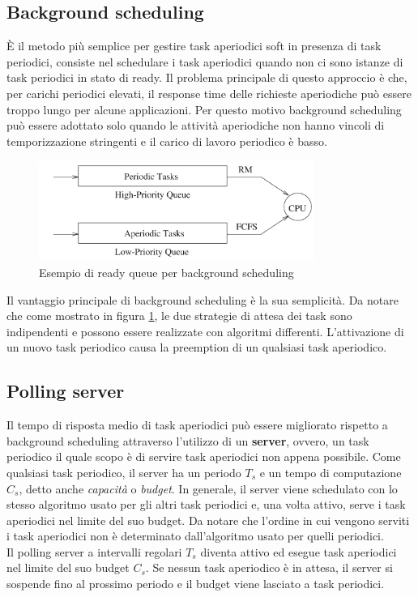 \documentclass[12pt]{article}
\begin{document}
\subsection{Background scheduling}
\label{sec:backgroundScheduling}
È il metodo più semplice per gestire task aperiodici soft in presenza di task periodici, consiste nel schedulare i task aperiodici quando non ci sono istanze di task periodici in stato di ready.
Il problema principale di questo approccio è che, per carichi periodici elevati, il response time delle richieste aperiodiche può essere troppo lungo per alcune applicazioni.
Per questo motivo background scheduling può essere adottato solo quando le attività aperiodiche non hanno vincoli di temporizzazione stringenti e il carico di lavoro periodico è basso.
\begin{figure}[H]
    \centering
    \includegraphics[width=0.8\textwidth]{pictures/backgroundScheduling.png}
    \caption{Esempio di ready queue per background scheduling}  
    \label{fig:backgroundScheduling}
\end{figure}
\noindent
Il vantaggio principale di background scheduling è la sua semplicità.
Da notare che come mostrato in figura \ref{fig:backgroundScheduling}, le due strategie di attesa dei task sono indipendenti e possono essere realizzate con algoritmi differenti.
L'attivazione di un nuovo task periodico causa la preemption di un qualsiasi task aperiodico.

\subsection{Polling server}
\label{sec:pollingServer}
Il tempo di risposta medio di task aperiodici può essere migliorato rispetto a background scheduling attraverso l'utilizzo di un \textbf{server}, ovvero, un task periodico il quale scopo è di servire task aperiodici non appena possibile.
Come qualsiasi task periodico, il server ha un periodo $T_s$ e un tempo di computazione $C_s$, detto anche \textit{capacità} o \textit{budget}.
In generale, il server viene schedulato con lo stesso algoritmo usato per gli altri task periodici e, una volta attivo, serve i task aperiodici nel limite del suo budget.
Da notare che l'ordine in cui vengono serviti i task aperiodici non è determinato dall'algoritmo usato per quelli periodici.
\\
Il polling server a intervalli regolari $T_s$  diventa attivo ed esegue task aperiodici nel limite del suo budget $C_s$.
Se nessun task aperiodico è in attesa, il server si sospende fino al prossimo periodo e il budget viene lasciato a task periodici.
\end{document}
